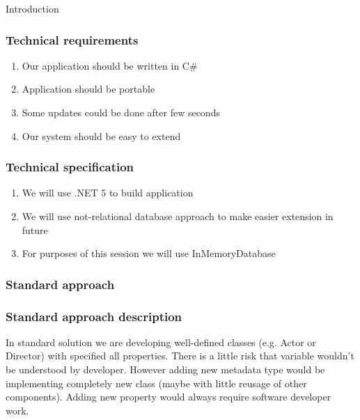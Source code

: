 \documentclass{beamer}
\begin{document}
\begin{section}{Introduction}
\begin{frame}

\end{frame}

\begin{frame}
\frametitle{Technical requirements}
\begin{enumerate}
	\item Our application should be written in C\# \pause
	\item Application should be portable \pause
	\item Some updates could be done after few seconds \pause
	\item Our system should be easy to extend
\end{enumerate}
\end{frame}

\begin{frame}
\frametitle{Technical specification}
\begin{enumerate}
	\item We will use .NET 5 to build application \pause
	\item We will use not-relational database approach to make easier extension in future \pause
	\item For purposes of this session we will use InMemoryDatabase
\end{enumerate}
\end{frame}

\begin{frame}
\frametitle{Standard approach \footnotemark[1]}




\end{frame}


\begin{frame}
\frametitle{Standard approach description}
In standard solution we are developing well-defined classes (e.g. Actor or Director) with specified all properties. 
There is a little risk that variable wouldn't be understood by developer. However adding new metadata type would be implementing
completely new class (maybe with little reusage of other components). Adding new property would always require software developer work.

\end{frame}


\end{section}
\end{document}
